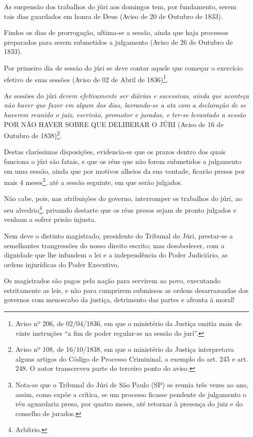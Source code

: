 As suspensão dos trabalhos do júri aos domingos tem, por fundamento,
serem tais dias guardados em honra de Deus (Aviso de 20 de Outubro de
1833).

Findos os dias de prorrogação, ultima-se a sessão, ainda que haja
processos preparados para serem submetidos a julgamento (Aviso de 26 de
Outubro de 1833).

Por primeiro dia de sessão do júri se deve contar aquele que começar o
exercício efetivo de suas sessões (Aviso de 02 de Abril de
1836)\footnote{Aviso nº 206, de 02/04/1836, em que o ministério da
  Justiça emitia mais de vinte instruções ``a fim de poder regular-se na
  sessão do jurí''.}.

As sessões do júri \emph{devem efetivamente ser diárias e sucessivas,
ainda que aconteça não haver que fazer em algum dos dias, lavrando-se a
ata com a declaração de se haverem reunido o juiz, escrivão, promotor e
jurados, e ter-se levantado a sessão} POR NÃO HAVER SOBRE QUE DELIBERAR
O JÚRI (Aviso de 16 de Outubro de 1838)\footnote{Aviso nº 108, de
  16/10/1838, em que o ministério da Justiça interpretava alguns artigos
  do Código de Processo Crimininal, a exemplo do art. 245 e art. 248. O
  autor transcreveu parte do terceiro ponto do aviso.}.

Destas claríssimas disposições, evidencia-se que os prazos dentro dos
quais funciona o júri são fatais, e que os réus que não forem submetidos
a julgamento em uma sessão, ainda que por motivos alheios da sua
vontade, ficarão presos por mais 4 meses\footnote{Nota-se que o
  Tribunal do Júri de São Paulo (SP) se reunia três vezes ao ano, assim,
  como expõe a crítica, se um processo ficasse pendente de julgamento o
  réu aguardaria preso, por quatro meses, até retornar à presença do
  juiz e do conselho de jurados.}, até a sessão seguinte, em que serão
julgados.

Não cabe, pois, nas atribuições do governo, interromper os trabalhos do
júri, ao seu alvedrio\footnote{Arbítrio.}, privando destarte que os
réus presos sejam de pronto julgados e venham a sofrer prisão injusta.

Nem deve o distinto magistrado, presidente do Tribunal do Júri,
prestar-se a semelhantes trangressões do nosso direito escrito; mas
desobedecer, com a dignidade que lhe infundem a lei e a independência do
Poder Judiciário, as ordens injurídicas do Poder Executivo.

Os magistrados são pagos pela nação para servirem ao povo, executando
estritamente as leis, e não para cumprirem submissos as ordens
desarrazoadas dos governos com menoscabo da justiça, detrimento das
partes e afronta à moral!


